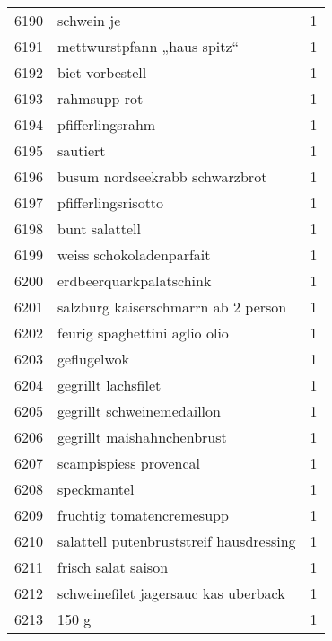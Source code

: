 \begin{tabular}{llr}
6190 &                                         schwein je &      1 \\
6191 &                        mettwurstpfann „haus spitz“ &      1 \\
6192 &                                    biet vorbestell &      1 \\
6193 &                                       rahmsupp rot &      1 \\
6194 &                                   pfifferlingsrahm &      1 \\
6195 &                                           sautiert &      1 \\
6196 &                     busum nordseekrabb schwarzbrot &      1 \\
6197 &                                pfifferlingsrisotto &      1 \\
6198 &                                     bunt salattell &      1 \\
6199 &                           weiss schokoladenparfait &      1 \\
6200 &                            erdbeerquarkpalatschink &      1 \\
6201 &                salzburg kaiserschmarrn ab 2 person &      1 \\
6202 &                      feurig spaghettini aglio olio &      1 \\
6203 &                                        geflugelwok &      1 \\
6204 &                                gegrillt lachsfilet &      1 \\
6205 &                         gegrillt schweinemedaillon &      1 \\
6206 &                         gegrillt maishahnchenbrust &      1 \\
6207 &                             scampispiess provencal &      1 \\
6208 &                                        speckmantel &      1 \\
6209 &                          fruchtig tomatencremesupp &      1 \\
6210 &            salattell putenbruststreif hausdressing &      1 \\
6211 &                                frisch salat saison &      1 \\
6212 &               schweinefilet jagersauc kas uberback &      1 \\
6213 &                                              150 g &      1 \\

\end{tabular}
